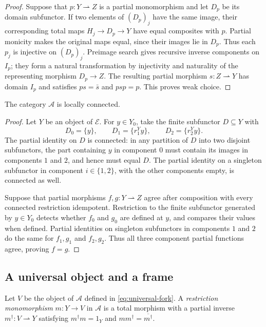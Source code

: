 \begin{proof}
Suppose that $p:Y\rightharpoonup Z$ is a partial monomorphism
and let $D_p$ be its domain subfunctor. If two elements of $(D_p)_j$
have the same image, their corresponding total maps
$H_j\to D_p\to Y$ have equal composites with $p$.
Partial monicity makes the original maps equal, since their
images lie in $D_p$. Thus each $p_j$ is injective on $(D_p)_j$.
Preimage search gives recursive inverse components on $I_p$;
they form a natural transformation by injectivity and naturality of
the representing morphism $D_p\to Z$.
The resulting partial morphism $s:Z\rightharpoonup Y$ has domain
$I_p$ and satisfies $ps=\bar s$ and $psp=p$.
This proves weak choice.
\end{proof}

\begin{proposition}\label{prop:fork-local}
The category $\mathcal A$ is locally connected.
\end{proposition}
\begin{proof}
Let $Y$ be an object of $\mathcal E$. For $y\in Y_0$, take the
finite subfunctor $D\subseteq Y$ with
\[
 D_0=\{y\},\qquad D_1=\{r_1^Yy\},\qquad D_2=\{r_2^Yy\}.
\]
The partial identity on $D$ is connected: in any partition of $D$
into two disjoint subfunctors, the part containing $y$ in component
$0$ must contain its images in components $1$ and $2$, and hence
must equal $D$. The partial identity on a singleton subfunctor
in component $i\in\{1,2\}$, with the other components empty,
is connected as well.

Suppose that partial morphisms $f,g:Y\rightharpoonup Z$ agree
after composition with every connected restriction idempotent.
Restriction to the
finite subfunctor generated by $y\in Y_0$ detects whether
$f_0$ and $g_0$ are defined at $y$, and compares their values
when defined. Partial identities on singleton subfunctors in
components $1$ and $2$ do the same for $f_1,g_1$ and $f_2,g_2$.
Thus all three component partial functions agree, proving $f=g$.
\end{proof}

\subsection{A universal object and a frame}

Let $V$ be the object of $\mathcal A$ defined in
\eqref{eq:universal-fork}.
A \emph{restriction monomorphism} $m:Y\to V$ in $\mathcal A$
is a total morphism with a partial inverse
$m^\dagger:V\rightharpoonup Y$ satisfying
$m^\dagger m=1_Y$ and $mm^\dagger=\overline{m^\dagger}$.

